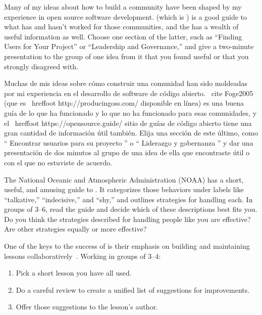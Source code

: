 
Many of my ideas about how to build a community
have been shaped by my experience in open source software development.
\cite{Foge2005} (which is )
is a good guide to what has and hasn't worked for those communities,
and the 
has a wealth of useful information as well.
Choose one section of the latter,
such as ``Finding Users for Your Project''
or ``Leadership and Governance,''
and give a two-minute presentation to the group of one idea from it
that you found useful or that you strongly disagreed with.

Muchas de mis ideas sobre cómo construir una comunidad han sido moldeadas por mi experiencia en el desarrollo de software de código abierto.
\ cite {Foge2005} (que es \ hreffoot {http://producingoss.com/} {disponible en línea})
es una buena guía de lo que ha funcionado y lo que no ha funcionado para esas comunidades,
y el \ hreffoot {https://opensource.guide/} {sitio de guías de código abierto}
tiene una gran cantidad de información útil también.
Elija una sección de este último, como `` Encontrar usuarios para su proyecto ''
o `` Liderazgo y gobernanza ''
y dar una presentación de dos minutos al grupo de una idea de ella
que encontraste útil o con el que no estuviste de acuerdo.


The National Oceanic and Atmospheric Administration (NOAA)
has a short, useful, and amusing guide to
.
It categorizes those behaviors under labels like ``talkative,'' ``indecisive,'' and ``shy,''
and outlines strategies for handling each.
In groups of 3--6,
read the guide and decide which of these descriptions best fits you.
Do you think the strategies described for handling people like you are effective?
Are other strategies equally or more effective?


One of the keys to the success of 
is their emphasis on building and maintaining lessons collaboratively~\cite{Wils2016,Deve2018}.
Working in groups of 3--4:

\begin{enumerate}

\item
  Pick a short lesson you have all used.

\item
  Do a careful review to create a unified list of suggestions for improvements.

\item
  Offer those suggestions to the lesson's author.

\end{enumerate}

